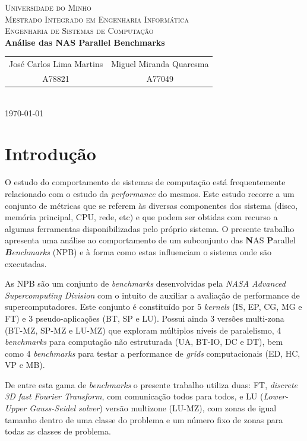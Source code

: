\documentclass{article}
\begin{document}
{
\center
\textsc{\Large Universidade do Minho} \\ [0.5cm]
\textsc{\Large Mestrado Integrado em Engenharia Informática} \\ [0.5cm]
\textsc{\large Engenharia de Sistemas de Computação} \\ [0.5cm]

{\LARGE \bfseries Análise das NAS Parallel Benchmarks} \\[0.2cm]

\begin{tabular}{c c}
    José Carlos Lima Martins & Miguel Miranda Quaresma \\
    A78821 & A77049  \\
\end{tabular} \\[0.5cm]

\today \\[1cm]
}



\section{Introdução}

\quad O estudo do comportamento de sistemas de computação está frequentemente relacionado com o estudo da \textit{performance} do mesmos.
Este estudo recorre a um conjunto de métricas que se referem às diversas componentes dos sistema (disco, memória principal,
CPU, rede, etc) e que podem ser obtidas com recurso a algumas ferramentas disponibilizadas pelo próprio sistema.
O presente trabalho apresenta uma análise ao comportamento de um subconjunto das \textbf{N}AS \textbf{P}arallel \textit{\textbf{B}enchmarks} (NPB) e à forma como estas influenciam o sistema onde são executadas.

As NPB são um conjunto de \textit{benchmarks} desenvolvidas pela \textit{NASA Advanced Supercomputing Division} com o intuito de auxiliar a 
avaliação de performance de supercomputadores. Este conjunto é constituído por 5 \textit{kernels} (IS, EP, CG, MG e FT) e 3 pseudo-aplicações 
(BT, SP e LU).  Possui ainda 3 versões multi-zona (BT-MZ, SP-MZ e LU-MZ) que exploram múltiplos níveis de paralelismo, 4 \textit{benchmarks} 
para computação não estruturada (UA, BT-IO, DC e DT), bem como 4 \textit{benchmarks} para testar a performance de \textit{grids} computacionais 
(ED, HC, VP e MB). 

De entre esta gama de \textit{benchmarks} o presente trabalho utiliza duas: FT, \textit{discrete 3D fast Fourier Transform}, com comunicação todos 
para todos, e LU (\textit{Lower-Upper Gauss-Seidel solver}) versão multizone (LU-MZ), com zonas de igual tamanho dentro de uma classe do problema 
e um número fixo de zonas para todas as classes de problema.
\end{document}
